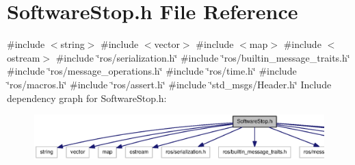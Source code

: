 \section{\-Software\-Stop.\-h \-File \-Reference}
\label{SoftwareStop_8h}
{\ttfamily \#include $<$string$>$}\*
{\ttfamily \#include $<$vector$>$}\*
{\ttfamily \#include $<$map$>$}\*
{\ttfamily \#include $<$ostream$>$}\*
{\ttfamily \#include \char`\"{}ros/serialization.\-h\char`\"{}}\*
{\ttfamily \#include \char`\"{}ros/builtin\-\_\-message\-\_\-traits.\-h\char`\"{}}\*
{\ttfamily \#include \char`\"{}ros/message\-\_\-operations.\-h\char`\"{}}\*
{\ttfamily \#include \char`\"{}ros/time.\-h\char`\"{}}\*
{\ttfamily \#include \char`\"{}ros/macros.\-h\char`\"{}}\*
{\ttfamily \#include \char`\"{}ros/assert.\-h\char`\"{}}\*
{\ttfamily \#include \char`\"{}std\-\_\-msgs/\-Header.\-h\char`\"{}}\*
\-Include dependency graph for \-Software\-Stop.\-h\-:
\nopagebreak
\begin{figure}[H]
\begin{center}
\leavevmode
\includegraphics[width=350pt]{SoftwareStop_8h__incl}
\end{center}
\end{figure}
